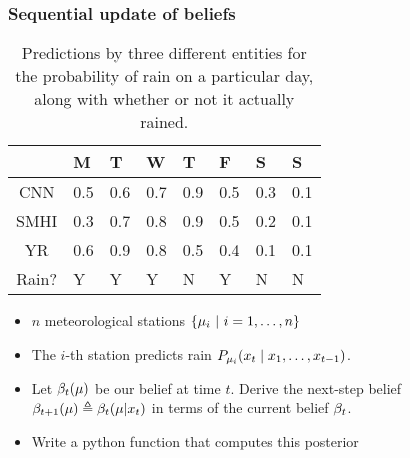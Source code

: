 \begin{frame}
  \frametitle{Sequential update of beliefs}
  {
    \begin{table}[h]
      \begin{tabular}{c|l|l|l|l|l|l|l}
        &M&T&W&T&F&S&S\\
        \hline
        CNN & 0.5 & 0.6 & 0.7 & 0.9 & 0.5 & 0.3 & 0.1\\
        SMHI & 0.3 & 0.7 & 0.8 & 0.9 & 0.5 & 0.2 & 0.1\\
        YR & 0.6 & 0.9 & 0.8 & 0.5 & 0.4 & 0.1 & 0.1\\
        \hline
        Rain? & Y & Y & Y & N & Y & N & N
      \end{tabular}
      \caption{Predictions by three different entities for the probability of rain on a particular day, along with whether or not it actually rained.}
      \label{tab:meteorologists}
    \end{table}
  }
  \begin{exercise}
    \begin{itemize}
    \item $n$ meteorological stations $\left\{\mu_i ~\middle|~ i=1, \ldots,n\right\}$
    \item The $i$-th station predicts rain $P_{\mu_i}(x_t \mid x_1, \ldots, x_{t-1})$.
    \item Let $\beta_t(\mu)$ be our belief at time $t$.
      Derive the next-step belief
      $\beta_{t+1}(\mu) \mathrel{\triangleq}  \beta_t(\mu | x_{t})$ in terms of the current belief $\beta_t$.
    \item Write a python function that computes this posterior
    \end{itemize}
  \end{exercise}
\end{frame}



